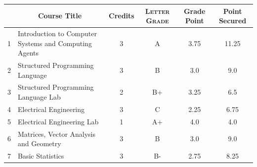 \documentclass[11pt]{article}
\newcommand*{\numtwo}[1]{\pgfmathprintnumber[
                    fixed, precision=2, fixed zerofill=true]{#1}}
\begin{document}
                \begin{center}
                    \renewcommand{\arraystretch}{1.08}
                    
                \begin{tabular}{|c|l|c|>{\scshape}c|c|c|}
                \hline  \rule[-1ex]{0pt}{3.5ex} {\centering{\bf Course Code}} &  \multicolumn{1}{c|}{\textbf{Course Title}}  & {\bf Credits} & {\bf Letter Grade} & {\bf Grade Point} & {\bf Point Secured}  \\ 
                \hline   1 &  Introduction to Computer Systems and Computing Agents		 & 3 & A & 3.75 & 11.25 \\ %
                \hline   2 &  Structured Programming Language		 & 3 & B & 3.0 & 9.0 \\ %
                \hline   3 &  Structured Programming Language Lab		 & 2 & B+ & 3.25 & 6.5 \\ %
                \hline   4 &  Electrical Engineering		 & 3 & C & 2.25 & 6.75 \\ %
                \hline   5 &  Electrical Engineering Lab		 & 1 & A+ & 4.0 & 4.0 \\ %
                \hline   6 &  Matrices, Vector Analysis and Geometry		 & 3 & B & 3.0 & 9.0 \\ %
                \hline   7 &  Basic Statistics		 & 3 & B- & 2.75 & 8.25 \\ %

\hline                %
                \end{tabular}
                \end{center}
                \renewcommand{\arraystretch}{1.03}
\end{document}
